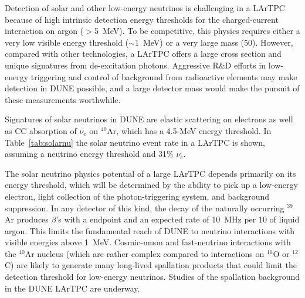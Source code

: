 Detection of solar and other low-energy neutrinos is challenging in
a LArTPC because of high intrinsic detection energy thresholds for
the charged-current interaction on argon ($>$\SI{5}{\MeV}). To be
competitive, this physics requires either a very low visible energy
threshold ($\sim$\SI{1}{\MeV}) or a very large mass (\SI{50}{\kt}).
However, compared with other technologies, a LArTPC offers a large
cross section and unique signatures from de-excitation
photons. Aggressive R\&D efforts in low-energy triggering and
control of background from radioactive elements may make detection
in DUNE possible, and a large detector mass would make the pursuit
of these measurements worthwhile.

Signatures of solar neutrinos in DUNE
are elastic scattering on electrons as well as CC absorption of $\nu_e$ on $^{40}$Ar, which has a 4.5-MeV energy threshold.
In Table~\ref{tab:solarnu} the solar neutrino event rate in a
 LArTPC is shown, assuming a  neutrino energy
threshold and 31\% $\nu_e$.
%
\begin{table}[!htb]
\caption[Solar neutrino rates in a LArTPC]{Solar neutrino event rates in a  LArTPC assuming 
a  neutrino energy threshold and 31\% $\nu_e$}
\label{tab:solarnu}
\end{table}


The solar neutrino physics potential of a large LArTPC depends
primarily on its energy threshold, which will 
be determined by the ability to pick up a low-energy electron, light collection of the photon-triggering system,
and background suppression. 
In any
detector of this kind, the decay of the naturally occurring $^{39}$Ar
produces $\beta$'s with a  endpoint and an expected rate
of \SI{10}{\MHz} per \SI{10}{\kt} of liquid argon. This limits the
fundamental reach of DUNE to neutrino interactions with visible
energies above \SI{1}{\MeV}. 
Cosmic-muon and fast-neutrino
interactions with the $^{40}$Ar nucleus (which are rather complex
compared to interactions on $^{16}$O or $^{12}$C) are likely to
generate many long-lived spallation products that could limit the
detection threshold for low-energy neutrinos.
Studies of the spallation background in the DUNE LArTPC are
underway. 

